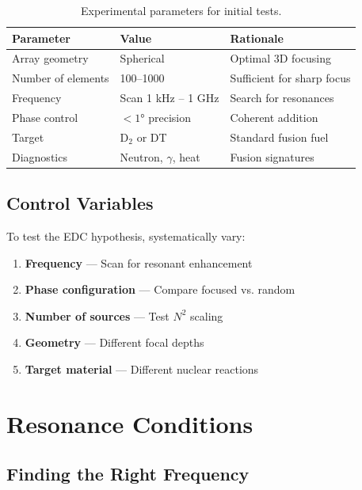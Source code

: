 \documentclass[12pt,a4paper]{article}
\begin{document}
\begin{table}[H]
\centering
\begin{tabular}{@{}lll@{}}
\toprule
\textbf{Parameter} & \textbf{Value} & \textbf{Rationale} \\
\midrule
Array geometry & Spherical & Optimal 3D focusing \\
Number of elements & 100--1000 & Sufficient for sharp focus \\
Frequency & Scan 1 kHz -- 1 GHz & Search for resonances \\
Phase control & $<1°$ precision & Coherent addition \\
Target & D$_2$ or DT & Standard fusion fuel \\
Diagnostics & Neutron, $\gamma$, heat & Fusion signatures \\
\bottomrule
\end{tabular}
\caption{Experimental parameters for initial tests.}
\end{table}

\subsection{Control Variables}

To test the EDC hypothesis, systematically vary:

\begin{enumerate}
    \item \textbf{Frequency} --- Scan for resonant enhancement
    \item \textbf{Phase configuration} --- Compare focused vs. random
    \item \textbf{Number of sources} --- Test $N^2$ scaling
    \item \textbf{Geometry} --- Different focal depths
    \item \textbf{Target material} --- Different nuclear reactions
\end{enumerate}

\section{Resonance Conditions}

\subsection{Finding the Right Frequency}
\end{document}
